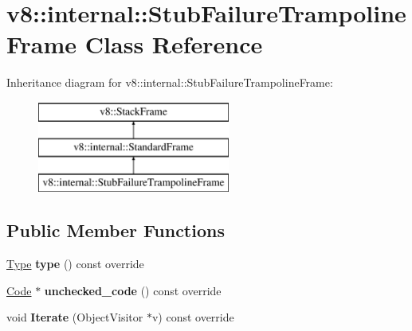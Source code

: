 \hypertarget{classv8_1_1internal_1_1_stub_failure_trampoline_frame}{}\section{v8\+:\+:internal\+:\+:Stub\+Failure\+Trampoline\+Frame Class Reference}
\label{classv8_1_1internal_1_1_stub_failure_trampoline_frame}
Inheritance diagram for v8\+:\+:internal\+:\+:Stub\+Failure\+Trampoline\+Frame\+:\begin{figure}[H]
\begin{center}
\leavevmode
\includegraphics[height=3.000000cm]{classv8_1_1internal_1_1_stub_failure_trampoline_frame}
\end{center}
\end{figure}
\subsection*{Public Member Functions}
\begin{DoxyCompactItemize}
\item 
\hyperlink{classv8_1_1internal_1_1_type}{Type} {\bfseries type} () const  override\hypertarget{classv8_1_1internal_1_1_stub_failure_trampoline_frame_ae55d1fae5bad2ba0a256caf2fd3adbf5}{}\label{classv8_1_1internal_1_1_stub_failure_trampoline_frame_ae55d1fae5bad2ba0a256caf2fd3adbf5}

\item 
\hyperlink{classv8_1_1internal_1_1_code}{Code} $\ast$ {\bfseries unchecked\+\_\+code} () const  override\hypertarget{classv8_1_1internal_1_1_stub_failure_trampoline_frame_af9255b67ce44a91631e13fcc045a131d}{}\label{classv8_1_1internal_1_1_stub_failure_trampoline_frame_af9255b67ce44a91631e13fcc045a131d}

\item 
void {\bfseries Iterate} (Object\+Visitor $\ast$v) const  override\hypertarget{classv8_1_1internal_1_1_stub_failure_trampoline_frame_af31df412cc127d6c0ef7ea203a83418f}{}\label{classv8_1_1internal_1_1_stub_failure_trampoline_frame_af31df412cc127d6c0ef7ea203a83418f}

\end{DoxyCompactItemize}
